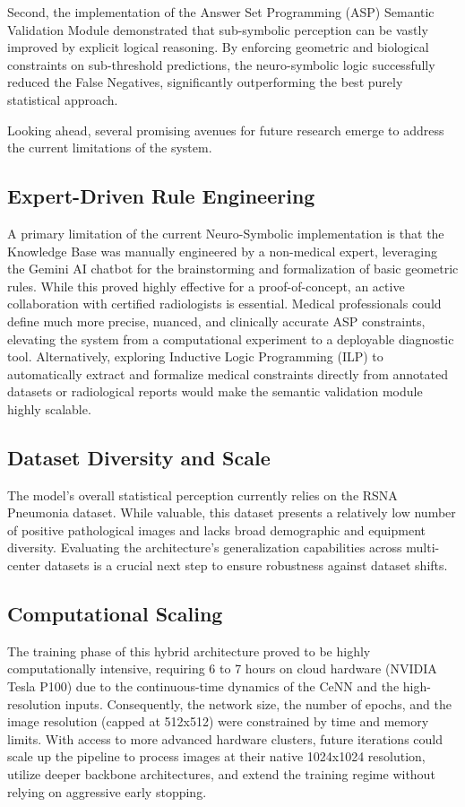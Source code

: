 \documentclass[a4paper,fleqn]{cas-dc}
\begin{document}
Second, the implementation of the Answer Set Programming (ASP) Semantic Validation Module demonstrated that sub-symbolic perception can be vastly improved by explicit logical reasoning. By enforcing geometric and biological constraints on sub-threshold predictions, the neuro-symbolic logic successfully reduced the False Negatives, significantly outperforming the best purely statistical approach.

Looking ahead, several promising avenues for future research emerge to address the current limitations of the system.

\subsection{Expert-Driven Rule Engineering}
A primary limitation of the current Neuro-Symbolic implementation is that the Knowledge Base was manually engineered by a non-medical expert, leveraging the Gemini AI chatbot for the brainstorming and formalization of basic geometric rules. While this proved highly effective for a proof-of-concept, an active collaboration with certified radiologists is essential. Medical professionals could define much more precise, nuanced, and clinically accurate ASP constraints, elevating the system from a computational experiment to a deployable diagnostic tool. Alternatively, exploring Inductive Logic Programming (ILP) to automatically extract and formalize medical constraints directly from annotated datasets or radiological reports would make the semantic validation module highly scalable.

\subsection{Dataset Diversity and Scale}
The model's overall statistical perception currently relies on the RSNA Pneumonia dataset. While valuable, this dataset presents a relatively low number of positive pathological images and lacks broad demographic and equipment diversity. Evaluating the architecture's generalization capabilities across multi-center datasets is a crucial next step to ensure robustness against dataset shifts.

\subsection{Computational Scaling}
The training phase of this hybrid architecture proved to be highly computationally intensive, requiring 6 to 7 hours on cloud hardware (NVIDIA Tesla P100) due to the continuous-time dynamics of the CeNN and the high-resolution inputs. Consequently, the network size, the number of epochs, and the image resolution (capped at 512x512) were constrained by time and memory limits. With access to more advanced hardware clusters, future iterations could scale up the pipeline to process images at their native 1024x1024 resolution, utilize deeper backbone architectures, and extend the training regime without relying on aggressive early stopping.
\end{document}
